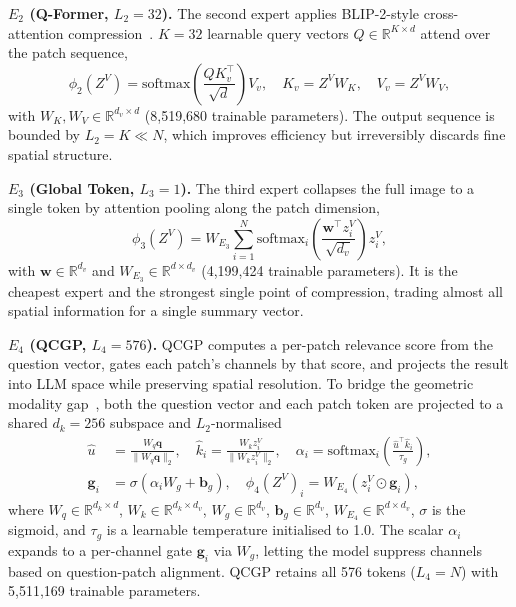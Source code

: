 \documentclass{article}
\begin{document}
\textbf{$E_2$ (Q-Former, $L_2 = 32$).} The second expert applies BLIP-2-style cross-attention compression~\citep{li2023blip2}. $K=32$ learnable query vectors $Q \in \mathbb{R}^{K \times d}$ attend over the patch sequence,
\begin{equation*}
    \phi_2(Z^V) = \mathrm{softmax}\!\left(\frac{Q K_v^\top}{\sqrt{d}}\right) V_v, \quad K_v = Z^V W_K, \quad V_v = Z^V W_V,
\end{equation*}
with $W_K, W_V \in \mathbb{R}^{d_v \times d}$ (8{,}519{,}680 trainable parameters). The output sequence is bounded by $L_2 = K \ll N$, which improves efficiency but irreversibly discards fine spatial structure.

\textbf{$E_3$ (Global Token, $L_3 = 1$).} The third expert collapses the full image to a single token by attention pooling along the patch dimension,
\begin{equation*}
    \phi_3(Z^V) = W_{E_3} \sum_{i=1}^{N} \mathrm{softmax}_i\!\left(\frac{\mathbf{w}^\top z_i^V}{\sqrt{d_v}}\right) z_i^V,
\end{equation*}
with $\mathbf{w} \in \mathbb{R}^{d_v}$ and $W_{E_3} \in \mathbb{R}^{d \times d_v}$ (4{,}199{,}424 trainable parameters). It is the cheapest expert and the strongest single point of compression, trading almost all spatial information for a single summary vector.

\textbf{$E_4$ (QCGP, $L_4 = 576$).} QCGP computes a per-patch relevance score from the question vector, gates each patch's channels by that score, and projects the result into LLM space while preserving spatial resolution. To bridge the geometric modality gap~\citep{liang2022modgap}, both the question vector and each patch token are projected to a shared $d_k = 256$ subspace and $L_2$-normalised
\begin{align}
  \hat{u} &= \tfrac{W_q \mathbf{q}}{\|W_q \mathbf{q}\|_2}, \quad
  \hat{k}_i = \tfrac{W_k z_i^V}{\|W_k z_i^V\|_2}, \quad
  \alpha_i = \mathrm{softmax}_i\!\left(\frac{\hat{u}^\top \hat{k}_i}{\tau_g}\right), \nonumber\\
  \mathbf{g}_i &= \sigma\!\left(\alpha_i W_g + \mathbf{b}_g\right), \quad
  \phi_4(Z^V)_i = W_{E_4}\!\left(z_i^V \odot \mathbf{g}_i\right),
  \label{eq:qcgp}
\end{align}
where $W_q \in \mathbb{R}^{d_k \times d}$, $W_k \in \mathbb{R}^{d_k \times d_v}$, $W_g \in \mathbb{R}^{d_v}$, $\mathbf{b}_g \in \mathbb{R}^{d_v}$, $W_{E_4} \in \mathbb{R}^{d \times d_v}$, $\sigma$ is the sigmoid, and $\tau_g$ is a learnable temperature initialised to 1.0. The scalar $\alpha_i$ expands to a per-channel gate $\mathbf{g}_i$ via $W_g$, letting the model suppress channels based on question-patch alignment. QCGP retains all 576 tokens ($L_4 = N$) with 5{,}511{,}169 trainable parameters.
\end{document}
